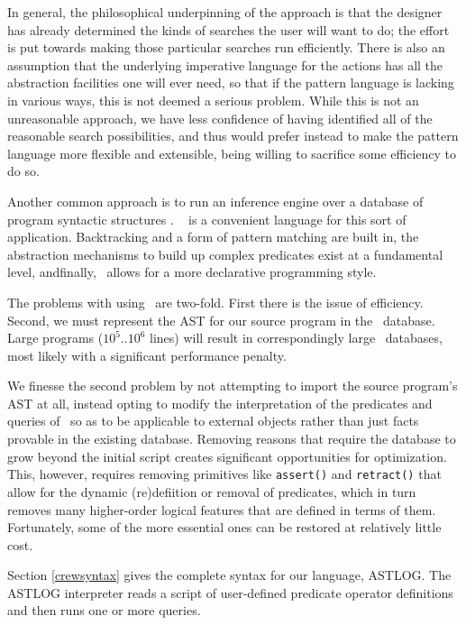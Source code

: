 In general, the philosophical underpinning of the  approach is that
the designer has already determined the kinds of searches the user will want to
do; the effort is put towards making those particular searches run efficiently.
There is also an assumption that the underlying imperative language for the
actions has all the abstraction facilities one will ever need, so that if the
pattern language is lacking in various ways, this is not deemed a serious
problem. While this is not an unreasonable approach, we have less confidence of
having identified all of the reasonable search possibilities, and thus would
prefer instead to make the pattern language more flexible and extensible, being
willing to sacrifice some efficiency to do so.


Another common approach is to run an inference engine over a database of program
syntactic structures \cite{BCD88, BGV90, CMR92}. \prolog\ \cite{SS86} is a
convenient language for this sort of application. Backtracking and a form of
pattern matching are built in, the abstraction mechanisms to build up complex
predicates exist at a fundamental level, andfinally, \prolog\ allows for a more
declarative programming style.

The problems with using \prolog\ are two-fold. First there is the issue of
efficiency. Second, we must represent the AST for our source program in the
\prolog\ database. Large programs ($10^5..10^6$ lines) will result in
correspondingly large \prolog\ databases, most likely with a significant
performance penalty.

We finesse the second problem by not attempting to import the source program's
AST at all, instead opting to modify the interpretation of the predicates and
queries of \prolog\ so as to be applicable to external objects rather than just
facts provable in the existing database. Removing reasons that require the
database to grow beyond the initial script creates significant opportunities for
optimization. This, however, requires removing primitives like \verb|assert()|
and \verb|retract()| that allow for the dynamic (re)defiition or removal of
predicates, which in turn removes many higher-order logical features that are
defined in terms of them. Fortunately, some of the more essential ones can be
restored at relatively little cost.

\secup

\secdown

Section \ref{crewsyntax} gives the complete syntax for our language, ASTLOG. The
ASTLOG interpreter reads a script of user-defined predicate operator definitions
and then runs one or more queries.

